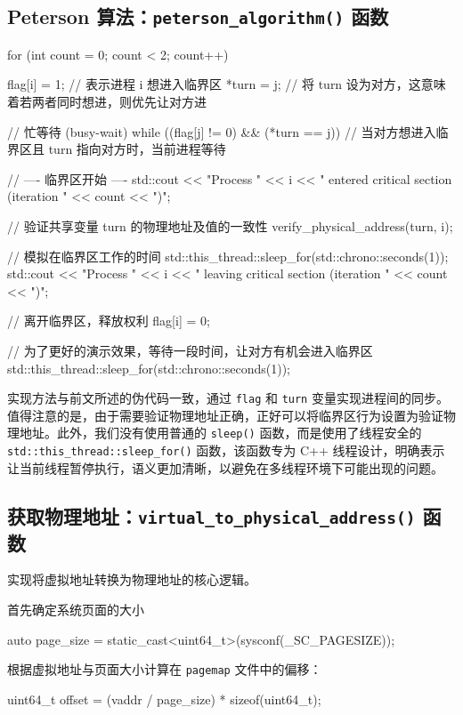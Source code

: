 \subsection{Peterson 算法：\texttt{peterson\_algorithm()} 函数}
\begin{cppcode}
for (int count = 0; count < 2; count++) {
    flag[i] = 1;    // 表示进程 i 想进入临界区
    *turn = j;      // 将 turn 设为对方，这意味着若两者同时想进，则优先让对方进

    // 忙等待 (busy-wait)
    while ((flag[j] != 0) && (*turn == j)) {
        // 当对方想进入临界区且 turn 指向对方时，当前进程等待
    }

    // ---- 临界区开始 ----
    std::cout << "Process " << i << " entered critical section (iteration " << count << ")\n";

    // 验证共享变量 turn 的物理地址及值的一致性
    verify_physical_address(turn, i);

    // 模拟在临界区工作的时间
    std::this_thread::sleep_for(std::chrono::seconds(1));
    std::cout << "Process " << i << " leaving critical section (iteration " << count << ")\n\n";

    // 离开临界区，释放权利
    flag[i] = 0;

    // 为了更好的演示效果，等待一段时间，让对方有机会进入临界区
    std::this_thread::sleep_for(std::chrono::seconds(1));
}
\end{cppcode}
实现方法与前文所述的伪代码一致，通过 \texttt{flag} 和 \texttt{turn} 变量实现进程间的同步。值得注意的是，由于需要验证物理地址正确，正好可以将临界区行为设置为验证物理地址。此外，我们没有使用普通的 \texttt{sleep()} 函数，而是使用了线程安全的 \texttt{std::this\_thread::sleep\_for()} 函数，该函数专为 C++ 线程设计，明确表示让当前线程暂停执行，语义更加清晰，以避免在多线程环境下可能出现的问题。

\subsection{获取物理地址：\texttt{virtual\_to\_physical\_address()} 函数}
实现将虚拟地址转换为物理地址的核心逻辑。

首先确定系统页面的大小
\begin{cppcode}
auto page_size = static_cast<uint64_t>(sysconf(_SC_PAGESIZE));
\end{cppcode}

根据虚拟地址与页面大小计算在 \texttt{pagemap} 文件中的偏移：
\begin{cppcode}
uint64_t offset = (vaddr / page_size) * sizeof(uint64_t);
\end{cppcode}

